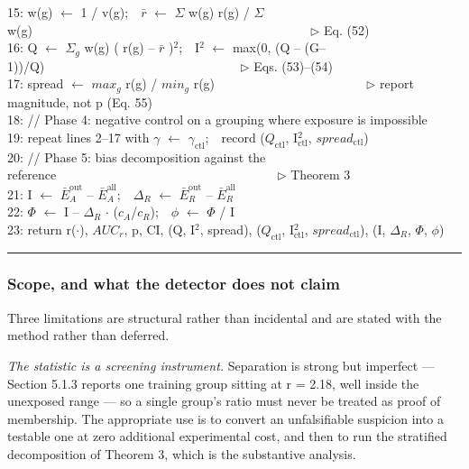 \begin{algorithm}[htbp]
{15: w(g) $\leftarrow$ 1 / v(g);~~$\bar{r}$ $\leftarrow$ $\Sigma$ w(g) r(g) / $\Sigma$ w(g)~~~~~~~~~~~~~~~~~~~~~~~~~~~~~~~~~~~~~~~~~~~~$\triangleright$ Eq. (52) \\
16: Q $\leftarrow$ $\Sigma_{g}$ w(g) ( r(g) -- $\bar{r}$ )$^{2}$;~~I$^{2}$ $\leftarrow$ max(0, (Q -- (G--1))/Q)~~~~~~~~~~~~~~~~~~~~~~~~~~~~~~~$\triangleright$ Eqs. (53)--(54) \\
17: spread $\leftarrow$ $max_{g}$ r(g) / $min_{g}$ r(g)~~~~~~~~~~~~~~~~~~~~~~~~$\triangleright$ report magnitude, not p (Eq. 55) \\
18: // Phase 4: negative control on a grouping where exposure is impossible \\
19: repeat lines 2--17 with $\gamma$ $\leftarrow$ $\gamma_{\mathrm{ctl}}$;~~record ($Q_{\mathrm{ctl}}$, I$^{2}_{\mathrm{ctl}}$, $spread_{\mathrm{ctl}}$) \\
20: // Phase 5: bias decomposition against the reference~~~~~~~~~~~~~~~~~~~~~~~~~~~~~~~~~~~$\triangleright$ Theorem 3 \\
21: $\mathrm{I}$ $\leftarrow$ $\bar{E}_{A}^{\mathrm{out}}$ -- $\bar{E}_{A}^{\mathrm{all}}$;~~$\Delta_{R}$ $\leftarrow$ $\bar{E}_{R}^{\mathrm{out}}$ -- $\bar{E}_{R}^{\mathrm{all}}$ \\
22: $\Phi$ $\leftarrow$ $\mathrm{I}$ -- $\Delta_{R}$ $\cdot$ ($c_{A}$/$c_{R}$);~~$\phi$ $\leftarrow$ $\Phi$ / $\mathrm{I}$ \\
23: return r($\cdot$), $AUC_{r}$, p, CI, (Q, I$^{2}$, spread), ($Q_{\mathrm{ctl}}$, I$^{2}_{\mathrm{ctl}}$, $spread_{\mathrm{ctl}}$), ($\mathrm{I}$, $\Delta_{R}$, $\Phi$, $\phi$)
\par}
\vspace{3pt}\hrule
\end{algorithm}

\subsubsection{Scope, and what the detector does not claim}

Three limitations are structural rather than incidental and are stated with the method rather than deferred.

\emph{The statistic is a screening instrument.} Separation is strong but imperfect --- Section 5.1.3 reports one training group sitting at r = 2.18, well inside the unexposed range --- so a single group's ratio must never be treated as proof of membership. The appropriate use is to convert an unfalsifiable suspicion into a testable one at zero additional experimental cost, and then to run the stratified decomposition of Theorem 3, which is the substantive analysis.

